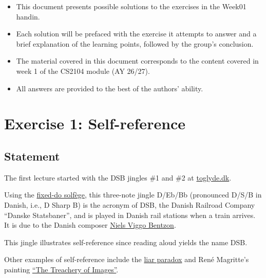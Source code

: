 \documentclass[12pt]{article}
\begin{document}
\begin{itemize}

\item
  This document presents possible solutions to the exercises in the Week01 handin.

\item
  Each solution will be prefaced with the exercise it attempts to answer and a brief explanation of the learning points, followed by the group's conclusion.

\item
  The material covered in this document corresponds to the content covered in week 1 of the CS2104 module (AY 26/27).

\item
  All answers are provided to the best of the authors' ability.

\end{itemize}


\newpage

\section{Exercise 1: Self-reference}


\subsection{Statement}

The first lecture started with the DSB jingles \#1 and \#2 at
\href{https://toglyde.dk/toglyde/stationslyde-inkl-hoejttalerudkald/}{toglyde.dk}.

Using the
\href{https://en.wikipedia.org/wiki/Solf\%C3\%A8ge\#Fixed_do_solf\%C3\%A8ge}{fixed-do solf\`ege},
this three-note jingle D/Eb/Bb (pronounced D/S/B in Danish, i.e., D Sharp B) is
the acronym of DSB, the Danish Railroad Company ``Danske Statsbaner'', and is
played in Danish rail stations when a train arrives. It is due to the Danish
composer
\href{https://en.wikipedia.org/wiki/Niels_Viggo_Bentzon}{Niels Viggo Bentzon}.

This jingle illustrates self-reference since reading aloud yields the name DSB.

Other examples of self-reference include the
\href{https://en.wikipedia.org/wiki/Liar_paradox}{liar paradox} and Ren\'e
Magritte's painting
\href{https://en.wikipedia.org/wiki/Ceci_n\%27est_pas_une_pipe}{``The Treachery of Images''}.
\end{document}
